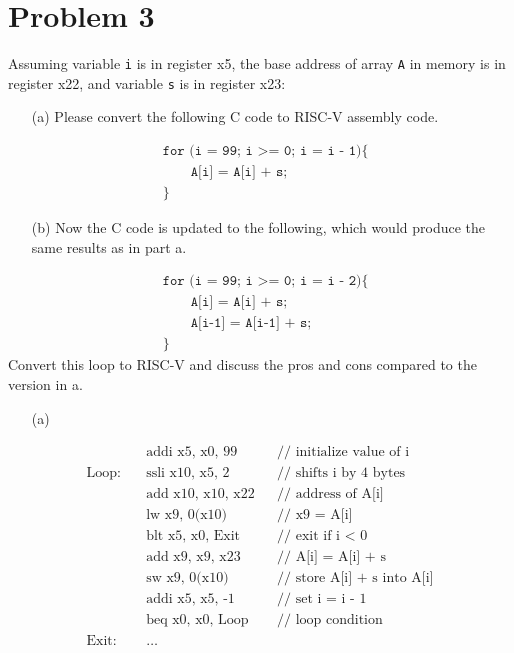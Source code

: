 \documentclass[12pt]{article}
\begin{document}
        \section*{Problem 3}
        \noindent Assuming variable \texttt{i} is in register x5, the base
        address of array \texttt{A} in memory is in register x22, and variable
        \texttt{s} is in register x23:
        \begin{itemize}
            \item[(a)] Please convert the following C code to RISC-V assembly
                code.
        \end{itemize}
        \begin{align*}
            &\texttt{for (i = 99; i >= 0; i = i - 1)\{} \\
            &\qquad \texttt{A[i] = A[i] + s;} \\
            &\texttt{\}}
        \end{align*}
        \newpage
        \begin{itemize}
            \item[(b)] Now the C code is updated to the following, which would
                produce the same results as in part a.
        \end{itemize}
        \begin{align*}
            &\texttt{for (i = 99; i >= 0; i = i - 2)\{} \\
            &\qquad \texttt{A[i] = A[i] + s;} \\
            &\qquad \texttt{A[i-1] = A[i-1] + s;} \\
            &\texttt{\}}
        \end{align*}
        Convert this loop to RISC-V and discuss the pros and cons compared to
        the version in a.
        \begin{itemize}
            \item[(a)]
        \end{itemize}
        \begin{align*}
                &\text{addi x5, x0, 99} &&\text{// initialize value of i} \\
            \text{Loop:}\quad
                &\text{ssli x10, x5, 2} &&\text{// shifts i by 4 bytes} \\
                &\text{add x10, x10, x22} &&\text{// address of A[i]} \\
                &\text{lw x9, 0(x10)} &&\text{// x9 = A[i]} \\
                &\text{blt x5, x0, Exit} &&\text{// exit if i $<$ 0} \\
                &\text{add x9, x9, x23} &&\text{// A[i] = A[i] + s} \\
                &\text{sw x9, 0(x10)} &&\text{// store A[i] + s into A[i]} \\
                &\text{addi x5, x5, -1} &&\text{// set i = i - 1} \\
                &\text{beq x0, x0, Loop} &&\text{// loop condition} \\
            \text{Exit:}\quad
                &\text{\ldots}
        \end{align*}
\end{document}
